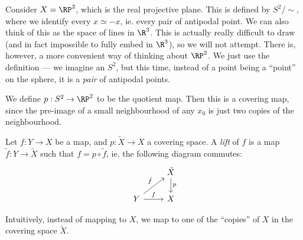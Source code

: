 \documentclass[a4paper]{article}
\begin{document}
\begin{eg}
  Consider $X = \RP^2$, which is the real projective plane. This is defined by $S^2/{\sim}$, where we identify every $x\simeq -x$, ie. every pair of antipodal point. We can also think of this as the space of lines in $\R^3$.  This is actually really difficult to draw (and in fact impossible to fully embed in $\R^3$), so we will not attempt. There is, however, a more convenient way of thinking about $\RP^2$. We just use the definition --- we imagine an $S^2$, but this time, instead of a point being a ``point'' on the sphere, it is a \emph{pair} of antipodal points.
  \begin{center}
  \end{center}
  We define $p: S^2 \to \RP^2$ to be the quotient map. Then this is a covering map, since the pre-image of a small neighbourhood of any $x_0$ is just two copies of the neighbourhood.
\end{eg}

\begin{defi}[Lifting]
  Let $f: Y\to X$ be a map, and $p: \tilde{X} \to X$ a covering space. A \emph{lift} of $f$ is a map $\tilde{f}: Y\to \tilde{X}$ such that $f = p\circ \tilde{f}$, ie. the following diagram commutes:
  \[
    \begin{tikzcd}
      & \tilde{X} \ar[d, "p"]\\
      Y \ar[ur, "\tilde{f}"] \ar [r, "f"] & X
    \end{tikzcd}
  \]
\end{defi}
Intuitively, instead of mapping to $X$, we map to one of the ``copies'' of $X$ in the covering space $\tilde{X}$.
\end{document}
